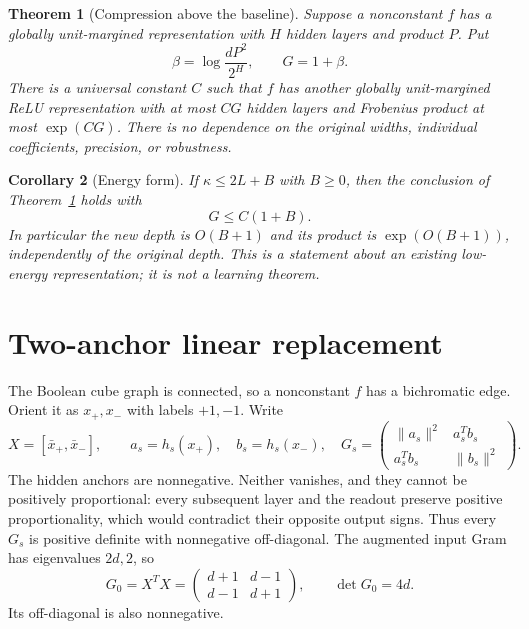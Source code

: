 \documentclass[11pt]{article}
\newtheorem{theorem}{Theorem}
\newtheorem{corollary}[theorem]{Corollary}
\theoremstyle{remark}\newtheorem{remark}[theorem]{Remark}
\begin{document}
\begin{theorem}[Compression above the baseline]\label{thm:compression}
Suppose a nonconstant $f$ has a globally unit-margined representation with
$H$ hidden layers and product $P$.  Put
\[
 \beta=\log\frac{dP^2}{2^H},\qquad
 G=1+\beta.
\]
There is a universal constant $C$ such that $f$ has another globally
unit-margined ReLU representation with at most $CG$ hidden layers and
Frobenius product at most $\exp(CG)$.  There is no dependence on the
original widths, individual coefficients, precision, or robustness.
\end{theorem}

\begin{corollary}[Energy form]\label{cor:energy}
If $\kappa\le2L+B$ with $B\ge0$, then the conclusion of
Theorem~\ref{thm:compression} holds with
\[
 G\le C(1+B).
\]
In particular the new depth is $O(B+1)$ and its product is
$\exp(O(B+1))$, independently of the original depth.  This is a statement about an existing
low-energy representation; it is not a learning theorem.
\end{corollary}

\section{Two-anchor linear replacement}
The Boolean cube graph is connected, so a nonconstant $f$ has a
bichromatic edge.  Orient it as $x_+,x_-$ with labels $+1,-1$.  Write
\[
 X=[\bar x_+,\bar x_-],\qquad
 a_s=h_s(x_+),\quad b_s=h_s(x_-),\quad
 G_s=\begin{pmatrix}\|a_s\|^2&a_s^Tb_s\\a_s^Tb_s&\|b_s\|^2\end{pmatrix}.
\]
The hidden anchors are nonnegative.  Neither vanishes, and they cannot be
positively proportional: every subsequent layer and the readout preserve
positive proportionality, which would contradict their opposite output
signs.  Thus every $G_s$ is positive definite with nonnegative off-diagonal.
The augmented input Gram has eigenvalues $2d,2$, so
\[
 G_0=X^TX=\begin{pmatrix}d+1&d-1\\d-1&d+1\end{pmatrix},
 \qquad \det G_0=4d.
\]
Its off-diagonal is also nonnegative.
\end{document}
